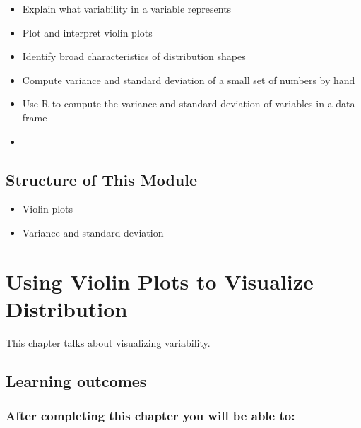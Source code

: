 \documentclass[
  12pt,
  letterpaper,
  DIV=11,
  numbers=noendperiod]{scrreprt}
\providecommand{\tightlist}{%
  \setlength{\itemsep}{0pt}\setlength{\parskip}{0pt}}
\begin{document}
\begin{itemize}
\tightlist
\item
  Explain what variability in a variable represents
\item
  Plot and interpret violin plots
\item
  Identify broad characteristics of distribution shapes
\item
  Compute variance and standard deviation of a small set of numbers by
  hand
\item
  Use R to compute the variance and standard deviation of variables in a
  data frame
\item
\end{itemize}

\section*{Structure of This Module}\label{structure-of-this-module-1}


\begin{itemize}
\tightlist
\item
  Violin plots
\item
  Variance and standard deviation
\end{itemize}

\chapter{Using Violin Plots to Visualize
Distribution}\label{using-violin-plots-to-visualize-distribution}

This chapter talks about visualizing variability.

\section*{Learning outcomes}\label{learning-outcomes-2}


\subsection*{After completing this chapter you will be able
to:}\label{after-completing-this-chapter-you-will-be-able-to}
\end{document}
